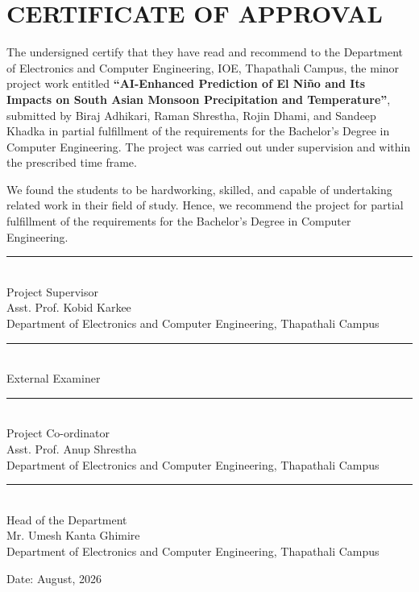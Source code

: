 \chapter*{CERTIFICATE OF APPROVAL}

The undersigned certify that they have read and recommend to the Department of Electronics and Computer Engineering, IOE, Thapathali Campus, the minor project work entitled \textbf{``AI-Enhanced Prediction of El Niño and Its Impacts on South Asian Monsoon Precipitation and Temperature''}, submitted by Biraj Adhikari, Raman Shrestha, Rojin Dhami, and Sandeep Khadka in partial fulfillment of the requirements for the Bachelor's Degree in Computer Engineering. The project was carried out under supervision and within the prescribed time frame.

\vspace{0.3cm}

\noindent We found the students to be hardworking, skilled, and capable of undertaking related work in their field of study. Hence, we recommend the project for partial fulfillment of the requirements for the Bachelor's Degree in Computer Engineering.

\vspace{0.6cm}

\noindent \rule{5.5cm}{0.4pt} \\[0.08cm]
Project Supervisor \\[0.03cm]
Asst. Prof. Kobid Karkee \\
Department of Electronics and Computer Engineering, Thapathali Campus

\vspace{0.5cm}

\noindent \rule{5.5cm}{0.4pt} \\[0.08cm]
External Examiner \\[0.03cm]


\vspace{0.5cm}

\noindent \rule{5.5cm}{0.4pt} \\[0.08cm]
Project Co-ordinator \\[0.03cm]
Asst. Prof. Anup Shrestha \\
Department of Electronics and Computer Engineering, Thapathali Campus

\vspace{0.5cm}

\noindent \rule{5.5cm}{0.4pt} \\[0.08cm]
Head of the Department \\[0.03cm]
Mr. Umesh Kanta Ghimire \\
Department of Electronics and Computer Engineering, Thapathali Campus

\vspace{0.3cm}

\noindent Date: August, 2026